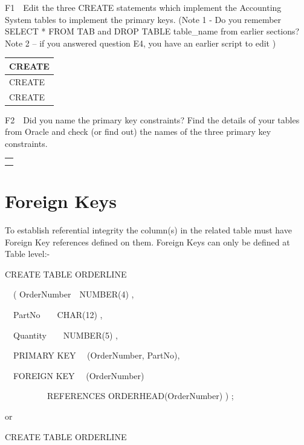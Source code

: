 F1\ \ Edit the three CREATE statements which implement the Accounting System tables to implement the primary keys.  (Note 1 - Do you remember SELECT * FROM TAB and DROP TABLE table\_name from earlier sections? Note 2 -- if you answered question E4, you have an earlier script to edit )

\begin{flushleft}
\tablefirsthead{}
\tablehead{}
\tabletail{}
\tablelasttail{}
\begin{supertabular}{|m{14.663cm}|}
\hline
CREATE

\\\hline
CREATE

\\\hline
CREATE

\\\hline
\end{supertabular}
\end{flushleft}
F2\ \ Did you name the primary key constraints? Find the details of your tables from Oracle and check (or find out) the names of the three primary key constraints.

\begin{flushleft}
\tablefirsthead{}
\tablehead{}
\tabletail{}
\tablelasttail{}
\begin{supertabular}{|m{14.663cm}|}
\hline
\\\hline
\\\hline
\\\hline
\end{supertabular}
\end{flushleft}
\section{Foreign Keys}
To establish referential integrity the column(s) in the related table must have Foreign Key references defined on them.  Foreign Keys can only be defined at Table level:-

CREATE TABLE ORDERLINE

\ \ ( OrderNumber\ \ NUMBER(4) ,

\ \   PartNo\ \ \ \ CHAR(12) ,

\ \   Quantity\ \ \ \ NUMBER(5) ,

\ \   PRIMARY KEY \ \ (OrderNumber, PartNo),

\ \   FOREIGN KEY \ \ (OrderNumber) 

\ \ \ \ \ \ \ \ \ \ REFERENCES ORDERHEAD(OrderNumber) ) ;

or

CREATE TABLE ORDERLINE

